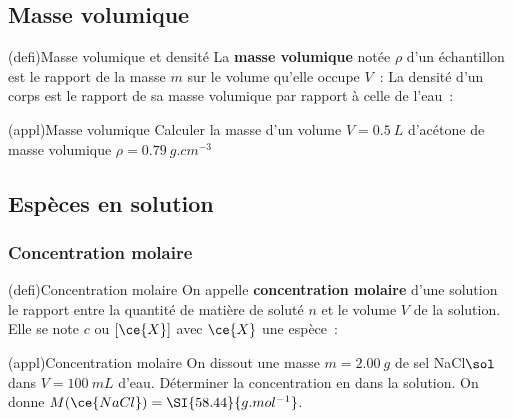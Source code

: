 \documentclass[../../main/main.tex]{subfiles}
\begin{document}
\subsection{Masse volumique}
\begin{tcb}[label=defi:massevol, sidebyside,
		righthand ratio=.4](defi){Masse volumique et densité}
	La \textbf{masse volumique} notée $\rho$ d'un échantillon est le rapport
	de la masse $m$ sur le volume qu'elle occupe $V$~:
	\csw{
		\[
			\boxed{\rho = \frac{m}{V}}
			\qen
			\si{kg.m^{-3}}
			\qou
			\si{g.L^{-1}}
			\qou
			\si{g.cm^{-3}}
		\]
	}
	\tcblower
	La densité d'un corps est le rapport de sa masse volumique par rapport à
	celle de l'eau~:
	\csw{
		\[
			\boxed{d = \frac{\rho}{\rho_{\eau}}}
			\qav
			\rho_{\eau} = \SI{1.0}{kg.L^{-1}}
		\]
	}
\end{tcb}
\begin{tcb}[label=exem:massvol](appl){Masse volumique}
	Calculer la masse d'un volume $V = \SI{0.5}{L}$ d'acétone de masse volumique
	$\rho = \SI{0.79}{g.cm^{-3}}$
	\tcblower
\end{tcb}

\vspace{-15pt}
\subsection{Espèces en solution}
\subsubsection{Concentration molaire}

\begin{tcb}[label=def:cmol](defi){Concentration molaire}
	On appelle \textbf{concentration molaire} d'une solution le
	rapport entre la quantité de matière de soluté $n$ et le volume $V$ de
	la solution. Elle se note $c$ ou $[\ce{X}]$ avec $\ce{X}$ une espèce~:
	\csw{
		\[
			\boxed{c = \frac{n}{V}}
			\qen
			\si{mol.L^{-1}}
		\]
	}
\end{tcb}
\begin{tcb}[label=exem:cmol, breakable](appl){Concentration molaire}
	On dissout une masse $m = \SI{2.00}{g}$ de sel NaCl$\sol$ dans $V =
		\SI{100}{mL}$ d'eau.
	\smallbreak
	Déterminer la concentration en  dans la solution.
	\smallbreak
	On donne $M(\ce{NaCl}) = \SI{58.44}{g.mol^{-1}}$.
	\tcblower
\end{tcb}
\end{document}
